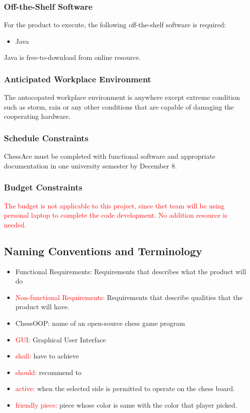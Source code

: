 \documentclass[12pt, titlepage]{article}
\begin{document}
\subsubsection{Off-the-Shelf Software}
For the product to execute, the following off-the-shelf software is required:
\begin{itemize}
\item Java
\end{itemize}
Java is free-to-download from online resource.
\subsubsection{Anticipated Workplace Environment}
The antocopated workplace environment is anywhere except extreme condition such as storm, rain or any other conditions that are capable of damaging the cooperating hardware.
\subsubsection{Schedule Constraints}
ChessAce must be completed with functional software and appropriate documentation in one university semester by December 8.
\subsubsection{Budget Constraints}
\textcolor{red}{The budget is not applicable to this project, since thet team will be using personal laptop to complete the code development. No addition resource is needed.}
\subsection{Naming Conventions and Terminology}
\begin{itemize}
\item Functional Requirements: Requirements that describes what the product will do
\item \textcolor{red}{Non-functional Requirements:} Requirements that describe qualities that the product will have.
\item ChessOOP: name of an open-source chess game program
\item \textcolor{red}{GUI:} Graphical User Interface
\item \textcolor{red}{shall:}  have to achieve
\item \textcolor{red}{should:} recommend to
\item \textcolor{red}{active:} when the selected side is permitted to operate on the chess board.
\item \textcolor{red}{friendly piece:} piece whose color is same with the color that player picked.

\end{itemize}
\end{document}
